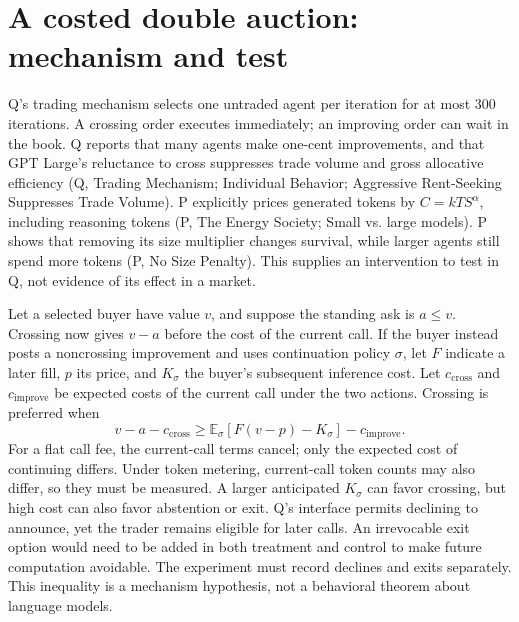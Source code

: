 \section*{A costed double auction: mechanism and test}

Q's trading mechanism selects one untraded agent per iteration for at most
\(300\) iterations. A crossing order executes immediately; an improving order
can wait in the book. Q reports that many agents make one-cent improvements,
and that GPT Large's reluctance to cross suppresses trade volume and gross
allocative efficiency (Q, Trading Mechanism; Individual Behavior; Aggressive
Rent-Seeking Suppresses Trade Volume). P explicitly prices generated tokens by
\(C=kTS^{\alpha}\), including reasoning tokens (P, The Energy Society; Small
vs. large models). P shows that removing its size multiplier changes survival,
while larger agents still spend more tokens (P, No Size Penalty). This supplies
an intervention to test in Q, not evidence of its effect in a market.

Let a selected buyer have value \(v\), and suppose the standing ask is
\(a\leq v\). Crossing now gives \(v-a\) before the cost of the current call.
If the buyer instead posts a noncrossing improvement and uses continuation
policy \(\sigma\), let \(F\) indicate a later fill, \(p\) its price, and
\(K_{\sigma}\) the buyer's subsequent inference cost. Let
\(c_{\mathrm{cross}}\) and \(c_{\mathrm{improve}}\) be expected costs of the
current call under the two actions. Crossing is preferred when
\[
v-a-c_{\mathrm{cross}} \geq
\mathbb{E}_{\sigma}\!\left[F(v-p)-K_{\sigma}\right]
-c_{\mathrm{improve}}.
\]
For a flat call fee, the current-call terms cancel; only the expected cost of
continuing differs. Under token metering, current-call token counts may also
differ, so they must be measured. A larger anticipated \(K_{\sigma}\) can
favor crossing, but high cost can also favor abstention or exit. Q's interface
permits declining to announce, yet the trader remains eligible for later calls.
An irrevocable exit option would need to be added in both treatment and control
to make future computation avoidable. The experiment must record declines and
exits separately. This inequality is a mechanism hypothesis, not a behavioral
theorem about language models.

